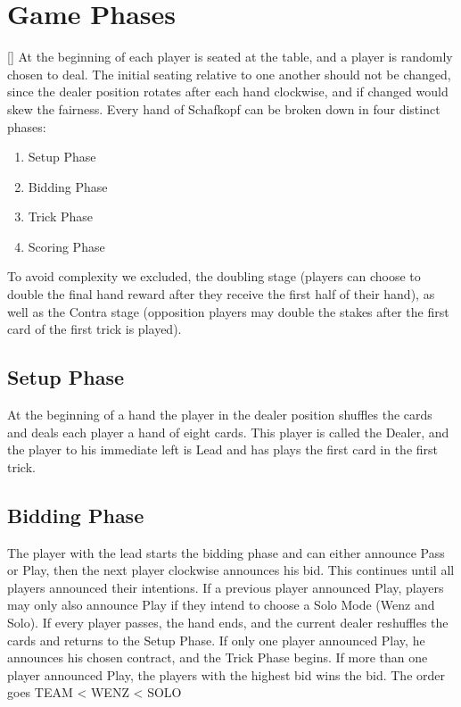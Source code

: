 \section{Game Phases}[\label{gamephases}]
At the beginning of each player is seated at the table, and a player is randomly chosen to deal.
The initial seating relative to one another should not be changed, since the dealer position rotates after each hand
clockwise, and if changed would skew the fairness.
\newline
Every hand of Schafkopf can be broken down in four distinct phases:
\begin{enumerate}
    \item Setup Phase
    \item Bidding Phase
    \item Trick Phase
    \item Scoring Phase
\end{enumerate}
To avoid complexity we excluded, the doubling stage (players can choose to double the final hand reward after they
receive the first half of their hand), as well as the Contra stage (opposition players may double the stakes after the
first card of the first trick is played).

\subsection{Setup Phase}
At the beginning of a hand the player in the dealer position shuffles the cards and deals each player a hand of eight
cards.
This player is called the Dealer, and the player to his immediate left is Lead and has plays the first card in the
first trick.

\subsection{Bidding Phase}
The player with the lead starts the bidding phase and can either announce Pass or Play, then the next player
clockwise announces his bid.
This continues until all players announced their intentions.
If a previous player announced Play, players may only also announce Play if they intend to choose a Solo Mode (Wenz
and Solo).
If every player passes, the hand ends, and the current dealer reshuffles the cards and returns to the Setup Phase.
If only one player announced Play, he announces his chosen contract, and the Trick Phase begins.
If more than one player announced Play, the players with the highest bid wins the bid.
The order goes TEAM < WENZ < SOLO

